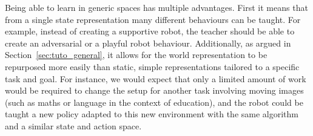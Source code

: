 Being able to learn in generic spaces has multiple advantages. First it means that from a single state representation many different behaviours can be taught. For example, instead of creating a supportive robot, the teacher should be able to create an adversarial or a playful robot behaviour. Additionally, as argued in Section~\ref{sec:tuto_general}, it allows for the world representation to be repurposed more easily than static, simple representations tailored to a specific task and goal. For instance, we would expect that only a limited amount of work would be required to change the setup for another task involving moving images (such as maths or language in the context of education), and the robot could be taught a new policy adapted to this new environment with the same algorithm and a similar state and action space. 








